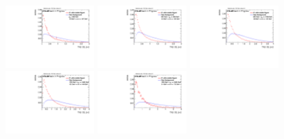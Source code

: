 \begin{figure}
\bigskip
\includegraphics[width=0.3\textwidth]{sascha_input/Appendix/Distributions/higgs/distributions/beta2/h_assisted_tj_D2_2_bin1.pdf} \hspace{1mm}
\includegraphics[width=0.3\textwidth]{sascha_input/Appendix/Distributions/higgs/distributions/beta2/h_assisted_tj_D2_2_bin2.pdf} \hspace{4mm}
\includegraphics[width=0.3\textwidth]{sascha_input/Appendix/Distributions/higgs/distributions/beta2/h_assisted_tj_D2_2_bin3.pdf} 
\bigskip
\includegraphics[width=0.3\textwidth]{sascha_input/Appendix/Distributions/higgs/distributions/beta2/h_assisted_tj_D2_2_bin4.pdf} \hspace{4mm}
\includegraphics[width=0.3\textwidth]{sascha_input/Appendix/Distributions/higgs/distributions/beta2/h_assisted_tj_D2_2_bin5.pdf} 


\end{figure}
